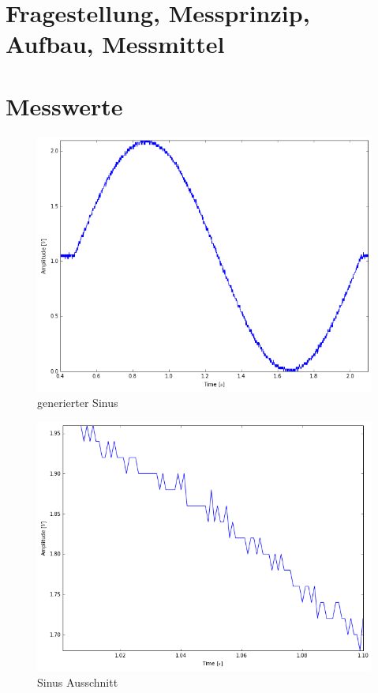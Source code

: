 \documentclass[12pt,oneside,a4paper]{report}
\begin{document}
\section{Fragestellung, Messprinzip, Aufbau, Messmittel}
\label{chap:VERSUCH_3_FRAGESTELLUNG}


\section{Messwerte}
\label{chap:VERSUCH_3_MESSWERTE}

\begin{figure}[H]
\centering\small
\includegraphics[width=\textwidth]{src/Sinus.png}
\caption{generierter Sinus}
\label{fig:SINUS}
\end{figure}

\begin{figure}[H]
\centering\small
\includegraphics[width=\textwidth]{src/Sinus_Ausschnitt.png}
\caption{Sinus Ausschnitt}
\label{fig:SINUS_A}
\end{figure}
\end{document}
